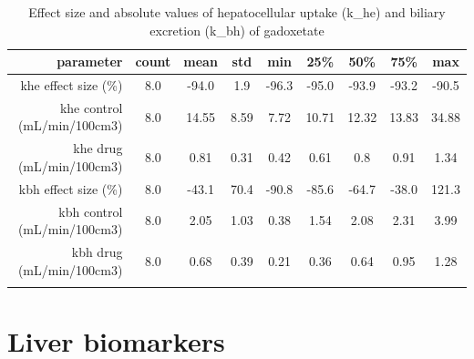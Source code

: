 \documentclass{epflreport}%
\begin{document}
%
\begin{longtable}{rcccccccc}%
\hline%
parameter&count&mean&std&min&25\%&50\%&75\%&max\\%
\hline%
khe effect size (\%)&8.0&{-}94.0&1.9&{-}96.3&{-}95.0&{-}93.9&{-}93.2&{-}90.5\\%
khe control (mL/min/100cm3)&8.0&14.55&8.59&7.72&10.71&12.32&13.83&34.88\\%
khe drug (mL/min/100cm3)&8.0&0.81&0.31&0.42&0.61&0.8&0.91&1.34\\%
kbh effect size (\%)&8.0&{-}43.1&70.4&{-}90.8&{-}85.6&{-}64.7&{-}38.0&121.3\\%
kbh control (mL/min/100cm3)&8.0&2.05&1.03&0.38&1.54&2.08&2.31&3.99\\%
kbh drug (mL/min/100cm3)&8.0&0.68&0.39&0.21&0.36&0.64&0.95&1.28\\%
\hline%
\caption{Effect size and absolute values of hepatocellular uptake (k\_he) and biliary excretion (k\_bh) of gadoxetate} \\%
\end{longtable}%
\clearpage%
\section{Liver biomarkers}%
\label{sec:Liverbiomarkers}%
\end{document}
